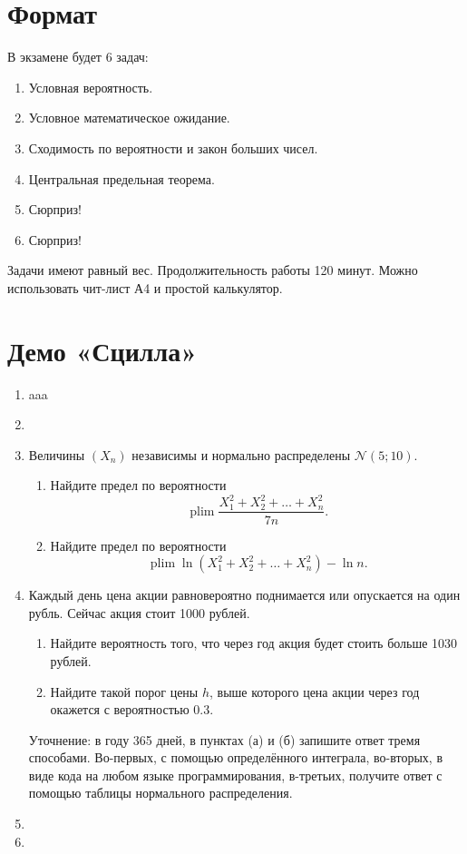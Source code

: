 \documentclass[12pt]{article}
\DeclareMathOperator{\plim}{plim}
\newcommand \cN{\mathcal{N}}
\begin{document}
\section*{Формат}

В экзамене будет 6 задач:
\begin{enumerate}
    \item Условная вероятность.
    \item Условное математическое ожидание. 
    \item Сходимость по вероятности и закон больших чисел.
    \item Центральная предельная теорема. 
    \item Сюрприз!
    \item Сюрприз!
\end{enumerate}
Задачи имеют равный вес. 
Продолжительность работы 120 минут. 
Можно использовать чит-лист А4 и простой калькулятор.

\section*{Демо «Сцилла»}
\begin{enumerate}
\item aaa
\item 
\item Величины $(X_n)$ независимы и нормально распределены $\cN(5; 10)$.

\begin{enumerate}
  \item Найдите предел по вероятности
  \[
  \plim \frac{X_1^2 + X_2^2 + \dots + X_n^2}{7n}.
  \]
  \item Найдите предел по вероятности
  \[
  \plim \ln(X_1^2 + X_2^2 + \dots + X_n^2) - \ln n.
  \]
\end{enumerate}

\item Каждый день цена акции равновероятно поднимается или опускается на один рубль. 
Сейчас акция стоит 1000 рублей.
\begin{enumerate}
    \item Найдите вероятность того, что через год акция будет стоить больше 1030 рублей.
    \item Найдите такой порог цены $h$, выше которого цена акции через год окажется с вероятностью $0.3$.
\end{enumerate}

Уточнение: в году 365 дней, в пунктах (а) и (б) запишите ответ тремя способами.
Во-первых, с помощью определённого интеграла, во-вторых, в виде кода на любом языке программирования, 
в-третьих, получите ответ с помощью таблицы нормального распределения. 

\item 
\item 



\end{enumerate}
\end{document}
